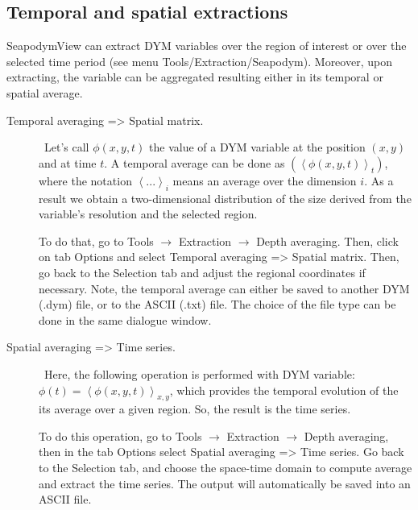 \subsection{Temporal and spatial extractions}

SeapodymView can extract DYM variables over the region of interest or over the selected time period (see menu {\ttfamily Tools/Extraction/Seapodym}). Moreover, upon extracting, the variable can be aggregated resulting either in its temporal or spatial average. 

\begin{description}

\item[Temporal averaging => Spatial matrix.] \ 
Let's call $\phi\left(x,y,t\right)$ the value of a DYM variable at the position $\left(x,y\right)$ and at time $t$. A temporal average can be done as $\left(\left<\phi\left(x,y,t\right)\right>_{t}\right)$, where the notation $\left< ... \right>_{i}$ means an average over the dimension $i$. As a result we obtain a two-dimensional distribution of the size derived from the variable's resolution and the selected region.
 
To do that, go to {\ttfamily Tools $\rightarrow$ Extraction $\rightarrow$ Depth averaging}. Then, click on tab {\ttfamily Options} and select {\ttfamily Temporal averaging => Spatial matrix}. Then, go back to the {\ttfamily Selection} tab and adjust the regional coordinates if necessary. Note, the temporal average can either be saved to another DYM ({\ttfamily .dym}) file, or to the ASCII ({\ttfamily .txt}) file. The choice of the file type can be done in the same dialogue window.\\

\item[Spatial averaging => Time series.] \
Here, the following operation is performed with DYM variable: $\phi\left(t\right) = \left<\phi\left(x,y,t\right)\right>_{x,y}$, which provides the temporal evolution of the its average over a given region. So, the result is the time series. 

To do this operation, go to {\ttfamily Tools $\rightarrow$ Extraction $\rightarrow$ Depth averaging}, then in the tab {\ttfamily Options} select {\ttfamily Spatial averaging => Time series}. Go back to the {\ttfamily Selection} tab, and choose the space-time domain to compute average and extract the time series. The output will automatically be saved into an {\ttfamily ASCII} file. \\ 
\end{description}

